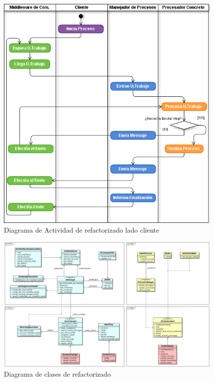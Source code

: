 \begin{figure}[ht]
    \includegraphics[scale=0.70]{images/ActivityFuDClient-Duplex.png}
    \caption{Diagrama de Actividad de \fud{} refactorizado lado cliente}
    \label{FuDClientDuplex}
\end{figure}

\begin{center}
    \begin{landscape}
        \begin{figure}[ht]
            \includegraphics[scale=.38]{images/fud_class.png}
            \caption{Diagrama de clases de \fud{} refactorizado}
            \label{fud_class_diagram}
        \end{figure}
    \end{landscape}
\end{center}


